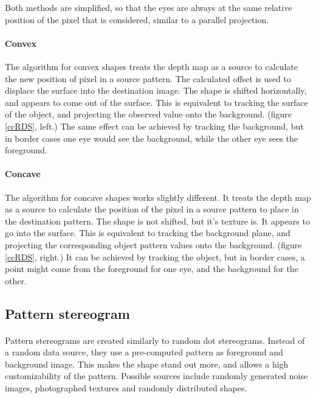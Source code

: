 Both methods are simplified, so that the eyes are always at the same relative position of the pixel that is considered, similar to a parallel projection.

\paragraph{Convex}
The algorithm for convex shapes treats the depth map as a source to calculate the new position of pixel in a source pattern. The calculated offset is used to displace the surface into the destination image. The shape is shifted horizontally, and appears to come out of the surface. This is equivalent to tracking the surface of the object, and projecting the observed value onto the background. (figure \ref{ccRDS}, left.)
The same effect can be achieved by tracking the background, but in border cases one eye would see the background, while the other eye sees the foreground.

\paragraph{Concave}
The algorithm for concave shapes works slightly different. It treats the depth map as a source to calculate the position of the pixel in a source pattern to place in the destination pattern. The shape is not shifted, but it's texture is. It appears to go into the surface. This is equivalent to tracking the background plane, and projecting the corresponding object pattern values onto the background. (figure \ref{ccRDS}, right.)
It can be achieved by tracking the object, but in border cases,  a point might come from the foreground for one eye, and the background for the other.

\subsection{Pattern stereogram}
\paragraph{}
Pattern stereograms are created similarly to random dot stereograms. Instead of a random data source, they use a pre-computed pattern as foreground and background image. This makes the shape stand out more, and allows a high customizability of the pattern. Possible sources include randomly generated noise images, photographed textures and randomly distributed shapes.


